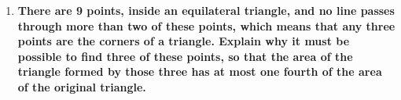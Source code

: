 \documentclass[article, 12pt]{article}
\theoremstyle{definition}
\begin{document}
\begin{enumerate}[(1)]
\begin{proof}
    \end{proof}
    \item \textbf{There are 9 points, inside an equilateral triangle, and no line passes through more than two of these points, which means that any three points are the corners of a triangle. Explain why it must be possible to find three of these points, so that the area of the triangle formed by those three has at most one fourth of the area of the original triangle.}
    
\end{enumerate}
\end{document}
